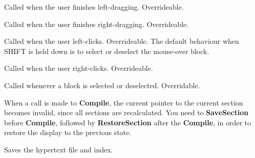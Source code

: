 

Called when the user finishes left-dragging. Overrideable.



Called when the user finishes right-dragging. Overrideable.



Called when the user left-clicks. Overrideable. The default behaviour when SHIFT is held down
is to select or deselect the mouse-over block.



Called when the user right-clicks. Overrideable.



Called whenever a block is selected or deselected. Overridable.



When a call is made to {\bf Compile}, the current pointer to the current
section becomes invalid, since all sections are recalculated. You need
to {\bf SaveSection} before {\bf Compile}, followed by {\bf RestoreSection} after
the {\bf Compile}, in order to restore the display to the previous state.



Saves the hypertext file and index.


